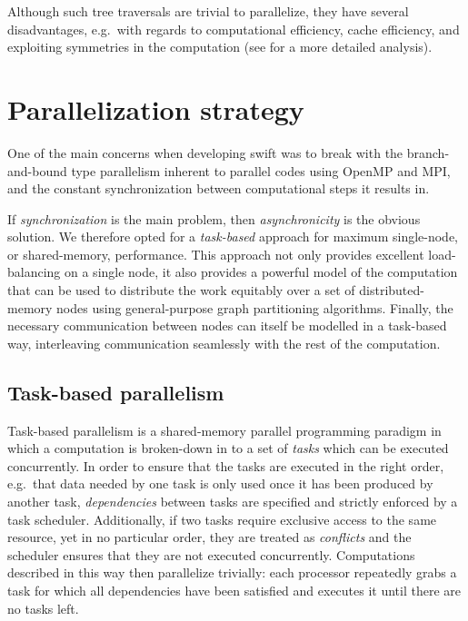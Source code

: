 \documentclass{sig-alternate-05-2015}
\newcommand{\swift}{{\sc swift}\xspace}
\begin{document}
Although such tree traversals are trivial to parallelize, they
have several disadvantages, e.g.~with regards to computational
efficiency, cache efficiency, and exploiting symmetries in the
computation (see \cite{gonnet2015efficient} for a more detailed
analysis).



\section{Parallelization strategy}

One of the main concerns when developing \swift was to break
with the branch-and-bound type parallelism inherent to parallel
codes using OpenMP and MPI, and the constant synchronization
between computational steps it results in.

If {\em synchronization} is the main problem, then {\em
  asynchronicity} is the obvious solution.  We therefore opted for a
{\em task-based} approach for maximum single-node, or shared-memory,
performance.  This approach not only provides excellent load-balancing
on a single node, it also provides a powerful model of the computation
that can be used to distribute the work equitably over a set of
distributed-memory nodes using general-purpose graph partitioning
algorithms.  Finally, the necessary communication between nodes can
itself be modelled in a task-based way, interleaving communication
seamlessly with the rest of the computation.


\subsection{Task-based parallelism}

Task-based parallelism is a shared-memory parallel programming
paradigm in which a computation is broken-down in to a set of
{\em tasks} which can be executed  concurrently.
In order to ensure that the tasks are executed in the right
order, e.g.~that data needed by one task is only used once it
has been produced by another task, {\em dependencies} between
tasks are specified and strictly enforced by a task scheduler.
Additionally, if two tasks require exclusive access to the same
resource, yet in no particular order, they are treated as
{\em conflicts} and the scheduler ensures that they are not executed
concurrently.
Computations described in this way then parallelize trivially:
each processor repeatedly grabs a task for which all dependencies
have been satisfied and executes it until there are no tasks left.
\end{document}
